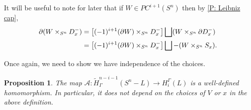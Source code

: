 \documentclass[12pt]{article}
\theoremstyle{plain}
\newtheorem{proposition}[theorem]{Proposition}
\theoremstyle{definition}
\theoremstyle{remark}
\newcommand{\td}[1]{\tilde{#1}}
\newcommand{\bd}{\partial}
\newcommand{\mc}[1]{\mathcal{#1}}
\begin{document}
It will be useful to note for later that if $W \in PC^{i+1}(S^n)$ then by \cref{P: Leibniz cap},
\begin{align}
\bd (W \times_{S^n} D_x^-) &= \left[(-1)^{i+1} (\bd W) \times_{S^n} D_x^-\right] \bigsqcup (W \times_{S^n} \bd D_x^-)\notag\\
&= \left[(-1)^{i+1} (\bd W) \times_{S^n} D_x^-\right] \bigsqcup - (W \times_{S^n} S_x). \label{E: leib bd}
\end{align}

Once again, we need to show we have independence of the choices.

\begin{proposition}
The map $\mc A \colon \td H^{n-i-1}_\Gamma(S^n-L) \to H_i^\Gamma(L)$ is a well-defined homomorphism.
In particular, it does not depend on the choices of $V$ or $x$ in the above definition.
\end{proposition}
\end{document}
